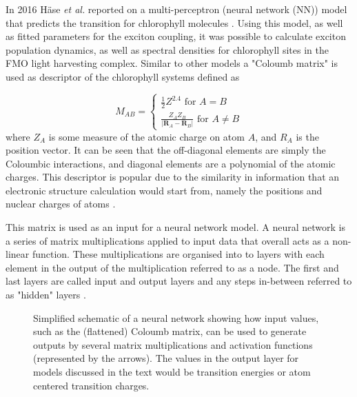 In 2016 H\"{a}se \emph{et al.} reported on a multi-perceptron (neural network (NN))
model that predicts the \Qy transition for chlorophyll molecules \cite{AspuruGuzik2016}.
Using this model, as well as fitted parameters for the exciton coupling, it was 
possible to calculate exciton population dynamics, as well as spectral densities
for chlorophyll sites in the FMO light harvesting complex. Similar to other models
a "Coloumb matrix" \cite{Rupp2012a, Montavon2013} is used as descriptor of the chlorophyll
systems defined as 

\begin{equation}
	M_{AB} = 
	  \begin{cases}
		\frac{1}{2} Z^{2.4} \text{ for } A = B\\
		\frac{Z_A Z_B}{\left\lvert \mathbf{R}_A - \mathbf{R}_B\right\rvert} \text{ for } A \neq B
	  \end{cases}
\end{equation}
%
where $Z_A$ is some measure of the atomic charge on atom $A$, and $R_A$ is the position
vector. It can be seen that the off-diagonal elements are simply the Coloumbic interactions,
and diagonal elements are a polynomial of the atomic charges. This descriptor is
popular due to the similarity in information that an electronic structure calculation
would start from, namely the positions and nuclear charges of atoms \cite{Raghunathan2022}.

This matrix is used as an input for a neural network model. A neural network is 
a series of matrix multiplications applied to input data that overall acts as a
non-linear function. These multiplications are organised into to layers with each 
element in the output of the multiplication referred to as a node. The first and
last layers are called  input and output layers and any steps in-between referred
to as "hidden" layers \cite{Rumelhart1986}.

\begin{figure}
	\centering
	\begin{neuralnetwork}[height=4]
        \hiddenlayer[count=4, bias=false, title=Hidden\\layer 1] \linklayers
        \hiddenlayer[count=3, bias=false, title=Hidden\\layer 2] \linklayers
        \outputlayer[count=2, title=Output\\layer] \linklayers
	\end{neuralnetwork}
	\label{fig:neural_network}
	\caption{Simplified schematic of a neural network showing how input values,
	such as the (flattened) Coloumb matrix, can be used to generate outputs by several
	matrix multiplications and activation functions (represented by the arrows). 
	The values in the output layer for models discussed in the text would be \Qy 
	transition energies or atom centered transition charges.}
\end{figure}

